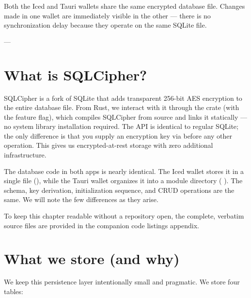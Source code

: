 \begin{notebox}
Both the Iced and Tauri wallets share the same encrypted database file. Changes made in one wallet are immediately visible in the other --- there is no synchronization delay because they operate on the same SQLite file.
\end{notebox}

---

\section{What is SQLCipher?}
\label{sec:sqlcipher-intro}

SQLCipher is a fork of SQLite that adds transparent 256-bit AES encryption to the entire database file. From Rust, we interact with it through the  crate (with the  feature flag), which compiles SQLCipher from source and links it statically --- no system library installation required. The API is identical to regular SQLite; the only difference is that you supply an encryption key via  before any other operation. This gives us encrypted-at-rest storage with zero additional infrastructure.

The database code in both apps is nearly identical. The Iced wallet stores it in a single file (), while the Tauri wallet organizes it into a module directory ( \code{+} ). The schema, key derivation, initialization sequence, and CRUD operations are the same. We will note the few differences as they arise.

To keep this chapter readable without a repository open, the complete, verbatim source files are provided in the companion code listings appendix.

\section{What we store (and why)}
\label{sec:database-schema}

We keep this persistence layer intentionally small and pragmatic. We store four tables:

